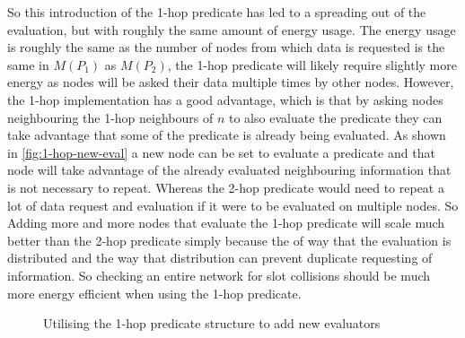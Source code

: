 So this introduction of the 1-hop predicate has led to a spreading out of the evaluation, but with roughly the same amount of energy usage. The energy usage is roughly the same as the number of nodes from which data is requested is the same in $M(P_{1})$ as $M(P_{2})$, the 1-hop predicate will likely require slightly more energy as nodes will be asked their data multiple times by other nodes. However, the 1-hop implementation has a good advantage, which is that by asking nodes neighbouring the 1-hop neighbours of $n$ to also evaluate the predicate they can take advantage that some of the predicate is already being evaluated. As shown in \autoref{fig:1-hop-new-eval} a new node can be set to evaluate a predicate and that node will take advantage of the already evaluated neighbouring information that is not necessary to repeat. Whereas the 2-hop predicate would need to repeat a lot of data request and evaluation if it were to be evaluated on multiple nodes. So Adding more and more nodes that evaluate the 1-hop predicate will scale much better than the 2-hop predicate simply because the of way that the evaluation is distributed and the way that distribution can prevent duplicate requesting of information. So checking an entire network for slot collisions should be much more energy efficient when using the 1-hop predicate.


\begin{figure}[H]
\centering
{}\hspace{3em}
\caption{Utilising the 1-hop predicate structure to add new evaluators}
\label{fig:1-hop-new-eval}
\end{figure}


